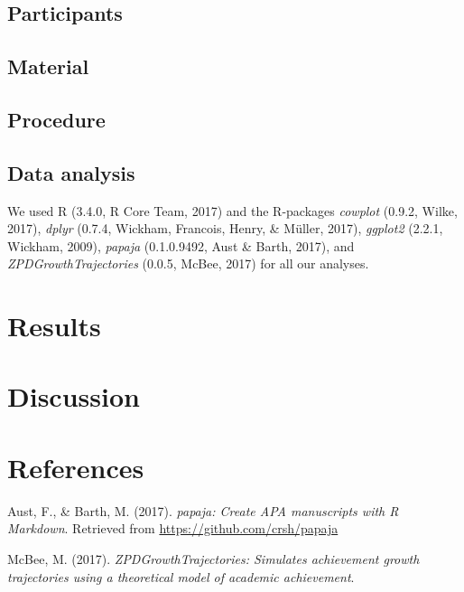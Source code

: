 \documentclass[english,floatsintext,man]{apa6}
\theoremstyle{definition}
\theoremstyle{definition}
\theoremstyle{definition}
\theoremstyle{remark}
\begin{document}
\subsection{Participants}\label{participants}

\subsection{Material}\label{material}

\subsection{Procedure}\label{procedure}

\subsection{Data analysis}\label{data-analysis}

We used R (3.4.0, R Core Team, 2017) and the R-packages \emph{cowplot}
(0.9.2, Wilke, 2017), \emph{dplyr} (0.7.4, Wickham, Francois, Henry, \&
Müller, 2017), \emph{ggplot2} (2.2.1, Wickham, 2009), \emph{papaja}
(0.1.0.9492, Aust \& Barth, 2017), and \emph{ZPDGrowthTrajectories}
(0.0.5, McBee, 2017) for all our analyses.

\section{Results}\label{results}

\section{Discussion}\label{discussion}

\newpage

\section{References}\label{references}

\setlength{\parindent}{-0.5in} \setlength{\leftskip}{0.5in}

\hypertarget{refs}{}
\hypertarget{ref-R-papaja}{}
Aust, F., \& Barth, M. (2017). \emph{papaja: Create APA manuscripts with
R Markdown}. Retrieved from \url{https://github.com/crsh/papaja}

\hypertarget{ref-R-ZPDGrowthTrajectories}{}
McBee, M. (2017). \emph{ZPDGrowthTrajectories: Simulates achievement
growth trajectories using a theoretical model of academic achievement}.
\end{document}
